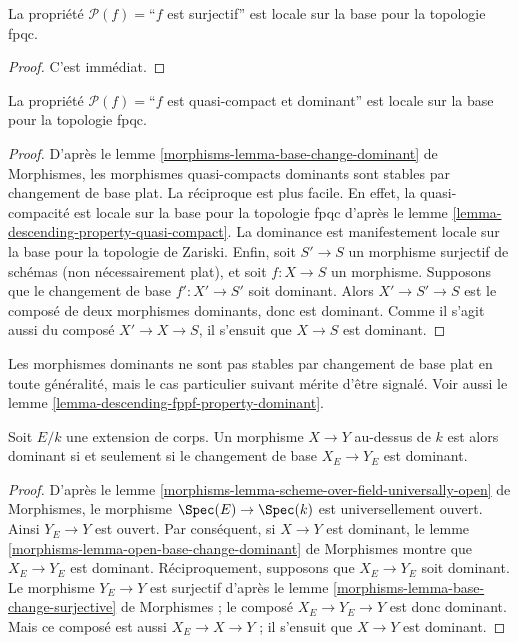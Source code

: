 \begin{lemma}
\label{lemma-descending-property-surjective}
La propriété $\mathcal{P}(f) =$``$f$ est surjectif'' est locale sur la base
pour la topologie fpqc.
\end{lemma}

\begin{proof}
C'est immédiat.
\end{proof}

\begin{lemma}
\label{lemma-descending-property-dominant}
La propriété $\mathcal{P}(f) =$``$f$ est quasi-compact et dominant'' est
locale sur la base pour la topologie fpqc.
\end{lemma}

\begin{proof}
D'après le lemme \ref{morphisms-lemma-base-change-dominant} de Morphismes, les
morphismes quasi-compacts dominants sont stables par changement de base plat.
La réciproque est plus facile. En effet, la quasi-compacité est locale sur la
base pour la topologie fpqc d'après le
lemme \ref{lemma-descending-property-quasi-compact}. La dominance est
manifestement locale sur la base pour la topologie de Zariski. Enfin, soit
$S' \to S$ un morphisme surjectif de schémas (non nécessairement plat), et
soit $f : X \to S$ un morphisme. Supposons que le changement de base
$f' : X' \to S'$ soit dominant. Alors $X' \to S'\to S$ est le composé de
deux morphismes dominants, donc est dominant. Comme il s'agit aussi du composé
$X' \to X \to S$, il s'ensuit que $X\to S$ est dominant.
\end{proof}

\noindent
Les morphismes dominants ne sont pas stables par changement de base plat en
toute généralité, mais le cas particulier suivant mérite d'être signalé.
Voir aussi le lemme \ref{lemma-descending-fppf-property-dominant}.

\begin{lemma}
\label{lemma-descending-property-dominant-over-field}
Soit $E/k$ une extension de corps. Un morphisme $X \to Y$ au-dessus de $k$
est alors dominant si et seulement si le changement de base $X_E \to Y_E$
est dominant.
\end{lemma}

\begin{proof}
D'après le lemme
\ref{morphisms-lemma-scheme-over-field-universally-open} de Morphismes, le morphisme
$\Spec(E) \to \Spec(k)$ est universellement ouvert. Ainsi $Y_E \to Y$ est
ouvert. Par conséquent, si $X \to Y$ est dominant, le lemme
\ref{morphisms-lemma-open-base-change-dominant} de Morphismes montre que $X_E \to Y_E$
est dominant. Réciproquement, supposons que $X_E \to Y_E$ soit dominant.
Le morphisme $Y_E \to Y$ est surjectif d'après le lemme
\ref{morphisms-lemma-base-change-surjective} de Morphismes ; le composé
$X_E \to Y_E \to Y$ est donc dominant. Mais ce composé est aussi
$X_E \to X \to Y$ ; il s'ensuit que $X \to Y$ est dominant.
\end{proof}

